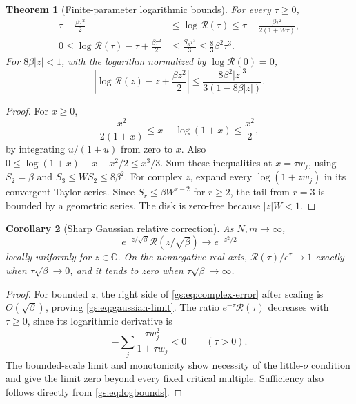 \documentclass[11pt,a4paper]{article}
\numberwithin{equation}{section}
\newtheorem{theorem}{Theorem}[section]
\newtheorem{corollary}[theorem]{Corollary}
\theoremstyle{definition}
\theoremstyle{remark}
\newcommand{\CC}{\mathbb C}
\newcommand{\Rgs}{\mathcal R}
\begin{document}
\begin{theorem}[Finite-parameter logarithmic bounds]\label{gs:thm:logbounds}
For every $\tau\ge0$,
\begin{align}\label{gs:eq:logbounds}
 \tau-\frac{\beta\tau^2}{2}
 &\le\log\Rgs(\tau)
 \le\tau-\frac{\beta\tau^2}{2(1+W\tau)},\\
 0\le\log\Rgs(\tau)-\tau+\frac{\beta\tau^2}{2}
 &\le\frac{S_3\tau^3}{3}
 \le\frac83\beta^2\tau^3.\label{gs:eq:third-error}
\end{align}
For $8\beta|z|<1$, with the logarithm normalized by $\log\Rgs(0)=0$,
\begin{equation}\label{gs:eq:complex-error}
 \left|\log\Rgs(z)-z+\frac{\beta z^2}{2}\right|
 \le\frac{8\beta^2|z|^3}{3(1-8\beta|z|)}.
\end{equation}
\end{theorem}
\begin{proof}
For $x\ge0$,
\[
 \frac{x^2}{2(1+x)}\le x-\log(1+x)\le\frac{x^2}{2},
\]
by integrating $u/(1+u)$ from zero to $x$. Also
$0\le\log(1+x)-x+x^2/2\le x^3/3$.
Sum these inequalities at $x=\tau w_j$, using $S_2=\beta$ and
$S_3\le WS_2\le8\beta^2$.
For complex $z$, expand every $\log(1+zw_j)$ in its convergent Taylor
series. Since $S_r\le\beta W^{r-2}$ for $r\ge2$, the tail from $r=3$
is bounded by a geometric series. The disk is zero-free because
$|z|W<1$.
\end{proof}

\begin{corollary}[Sharp Gaussian relative correction]\label{gs:cor:gaussian}
As $N,m\to\infty$,
\begin{equation}\label{gs:eq:gaussian-limit}
 e^{-z/\sqrt\beta}\Rgs(z/\sqrt\beta)
 \longrightarrow e^{-z^2/2}
\end{equation}
locally uniformly for $z\in\CC$. On the nonnegative real axis,
$\Rgs(\tau)/e^\tau\to1$ exactly when $\tau\sqrt\beta\to0$, and it
tends to zero when $\tau\sqrt\beta\to\infty$.
\end{corollary}
\begin{proof}
For bounded $z$, the right side of \eqref{gs:eq:complex-error} after scaling
is $O(\sqrt\beta)$, proving \eqref{gs:eq:gaussian-limit}.
The ratio $e^{-\tau}\Rgs(\tau)$ decreases with $\tau\ge0$, since its
logarithmic derivative is
\[
 -\sum_j\frac{\tau w_j^2}{1+\tau w_j}<0\qquad(\tau>0).
\]
The bounded-scale limit and monotonicity show necessity of the
little-$o$ condition and give the limit zero beyond every fixed critical
multiple. Sufficiency also follows directly from \eqref{gs:eq:logbounds}.
\end{proof}
\end{document}
